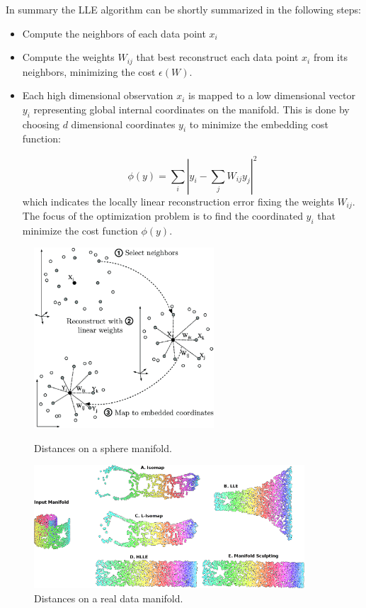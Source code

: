 \documentclass[11pt,a4paper]{article}
\begin{document}
In summary the LLE algorithm can be shortly summarized in the following steps:
\begin{itemize}
	\item Compute the neighbors of each data point $x_i$
	\item Compute the weights $W_{ij}$ that best reconstruct each data point $x_i$ from its neighbors, minimizing the cost $\epsilon(W)$.
	\item Each high dimensional observation $x_i$ is mapped to a low dimensional vector $y_i$ representing global internal coordinates on the manifold. This is done by choosing $d$ dimensional coordinates $y_i$ to minimize the embedding cost function:
	
	$$ \phi(y) = \sum_i |y_i - \sum_j {W_{ij}y_j}|^2 $$
	which indicates the locally linear reconstruction error fixing the weights $W_{ij}$. The focus of the optimization problem is to find the coordinated $y_i$ that minimize the cost function $\phi(y)$.
\end{itemize}

\begin{figure}[H]
	\begin{minipage}[t]{0.5\linewidth}
		\centering
		\includegraphics[width=0.6\textwidth]{img/LLEAlgorithm.png}
		\caption{Distances on a sphere manifold.}
	\end{minipage}
	\hspace{0.1cm}
	\begin{minipage}[t]{0.5\linewidth} 
		\centering
		\includegraphics[width=0.9\textwidth]{img/comparison.png}
		\caption{Distances on a real data manifold.}
		\label{comparison}
	\end{minipage}        
\end{figure}
\end{document}
